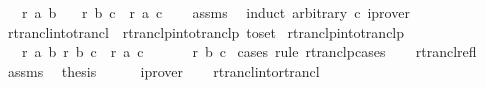 \begin{isabellebody}
\ \ \ {\isachardoublequoteopen}r\isactrlsup {\isacharasterisk}{\kern0pt}\isactrlsup {\isacharasterisk}{\kern0pt}\ a\ b{\isachardoublequoteclose}\isanewline
\ \ \ {\isachardoublequoteopen}r\ b\ c\ {\isasymLongrightarrow}\ r\isactrlsup {\isacharplus}{\kern0pt}\isactrlsup {\isacharplus}{\kern0pt}\ a\ c{\isachardoublequoteclose}\isanewline
%
\isadelimproof
\ \ %
\endisadelimproof
%
\isatagproof
{}\isamarkupfalse%
\ assms\ \isamarkupfalse%
\ {\isacharparenleft}{\kern0pt}induct\ arbitrary{\isacharcolon}{\kern0pt}\ c{\isacharparenright}{\kern0pt}\ iprover{\isacharplus}{\kern0pt}%
\endisatagproof
{\isafoldproof}%
%
\isadelimproof
\isanewline
%
\endisadelimproof
\isanewline
{}\isamarkupfalse%
\ rtrancl{\isacharunderscore}{\kern0pt}into{\isacharunderscore}{\kern0pt}trancl{}\ {\isacharequal}{\kern0pt}\ rtranclp{\isacharunderscore}{\kern0pt}into{\isacharunderscore}{\kern0pt}tranclp{}\ {\isacharbrackleft}{\kern0pt}to{\isacharunderscore}{\kern0pt}set{\isacharbrackright}{\kern0pt}\isanewline
\isanewline
{}\isamarkupfalse%
\ rtranclp{\isacharunderscore}{\kern0pt}into{\isacharunderscore}{\kern0pt}tranclp{}{\isacharcolon}{\kern0pt}\isanewline
\ \ \ {\isachardoublequoteopen}r\ a\ b{\isachardoublequoteclose}\ {\isachardoublequoteopen}r\isactrlsup {\isacharasterisk}{\kern0pt}\isactrlsup {\isacharasterisk}{\kern0pt}\ b\ c{\isachardoublequoteclose}\ \ {\isachardoublequoteopen}r\isactrlsup {\isacharplus}{\kern0pt}\isactrlsup {\isacharplus}{\kern0pt}\ a\ c{\isachardoublequoteclose}\isanewline
\ \ %
\isanewline
%
\isadelimproof
\ \ %
\endisadelimproof
%
\isatagproof
{}\isamarkupfalse%
\ {\isacartoucheopen}r\isactrlsup {\isacharasterisk}{\kern0pt}\isactrlsup {\isacharasterisk}{\kern0pt}\ b\ c{\isacartoucheclose}\isanewline
{}\isamarkupfalse%
\ {\isacharparenleft}{\kern0pt}cases\ rule{\isacharcolon}{\kern0pt}\ rtranclp{\isachardot}{\kern0pt}cases{\isacharparenright}{\kern0pt}\isanewline
\ \ \isamarkupfalse%
\ rtrancl{\isacharunderscore}{\kern0pt}refl\isanewline
\ \ \isamarkupfalse%
\ assms\ \isamarkupfalse%
\ {\isacharquery}{\kern0pt}thesis\isanewline
\ \ \ \ \isamarkupfalse%
\ iprover\isanewline
{}\isamarkupfalse%
\isanewline
\ \ \isamarkupfalse%
\ rtrancl{\isacharunderscore}{\kern0pt}into{\isacharunderscore}{\kern0pt}rtrancl\isanewline

\end{isabellebody}
